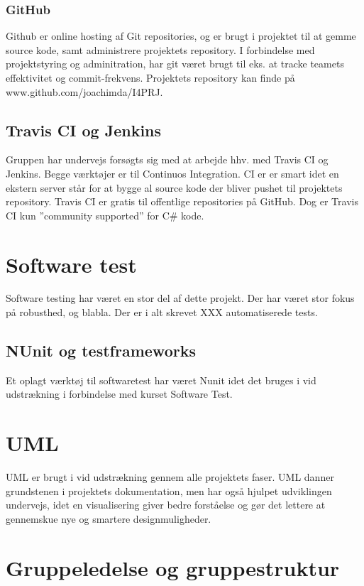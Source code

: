 \subsubsection{GitHub}
Github er online hosting af Git repositories, og er brugt i projektet til at gemme source kode, samt administrere projektets repository. I forbindelse med projektstyring og adminitration, har git været brugt til eks. at tracke teamets effektivitet og commit-frekvens.
Projektets repository kan finde på www.github.com/joachimda/I4PRJ.

\subsection{Travis CI og Jenkins}
Gruppen har undervejs forsøgts sig med at arbejde hhv. med Travis CI og Jenkins. Begge værktøjer er til Continuos Integration. CI er er smart idet en ekstern server står for at bygge al source kode der bliver pushet til projektets repository.  Travis CI er gratis til offentlige repositories på GitHub. Dog er Travis CI kun ”community supported” for C\# kode.

\section{Software test}
Software testing har været en stor del af dette projekt. Der har været stor fokus på robusthed, og blabla. Der er i alt skrevet XXX automatiserede tests.

\subsection{NUnit og testframeworks}
Et oplagt værktøj til softwaretest har været Nunit idet det bruges i vid udstrækning i forbindelse med kurset Software Test.

\section{UML}
UML er brugt i vid udstrækning gennem alle projektets faser. UML danner grundstenen i projektets dokumentation, men har også hjulpet udviklingen undervejs, idet en visualisering giver bedre forståelse og gør det lettere at gennemskue nye og smartere designmuligheder.

\section{Gruppeledelse og gruppestruktur}